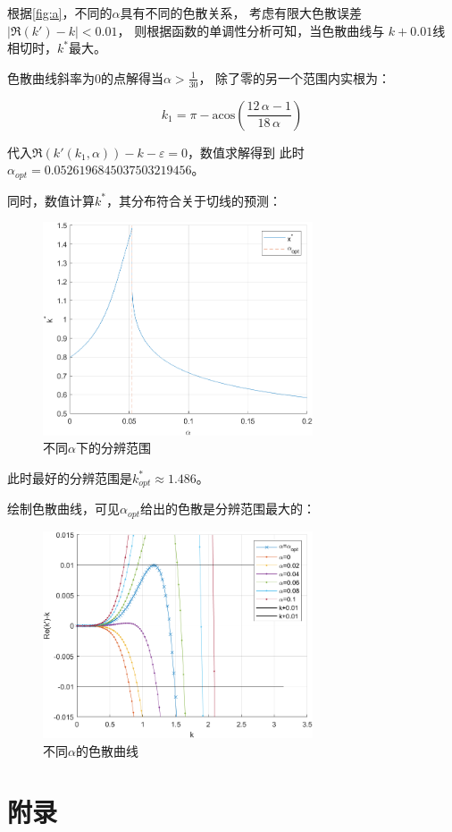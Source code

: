 \documentclass[UTF8,zihao=5]{ctexart} %
\begin{document}
根据\ref{fig:a}，不同的$\alpha$具有不同的色散关系，
考虑有限大色散误差$|\Re(k')-k|<0.01$，
则根据函数的单调性分析可知，当色散曲线与
$k+0.01$线相切时，$k^*$最大。

色散曲线斜率为0的点解得当$\alpha > \frac{1}{30}$，
除了零的另一个范围内实根为：

$$
    k_1=\pi -\mathrm{acos}\left(\frac{12\,\alpha -1}{18\,\alpha }\right)
$$

代入$\Re(k'(k_1,\alpha))-k-\varepsilon=0$，数值求解得到
此时$\alpha_{opt}=0.0526196845037503219456$。

同时，数值计算$k^*$，其分布符合关于切线的预测：
\begin{figure}[H]
    \centering
    \includegraphics[width=8cm]{Aopt.png}  %
    \caption{不同$\alpha$下的分辨范围}
\end{figure}
此时最好的分辨范围是$k^*_{opt}\approx1.486$。

绘制色散曲线，可见$\alpha_{opt}$给出的色散是分辨范围最大的：
\begin{figure}[H]
    \centering
    \includegraphics[width=8cm]{RE_Err.png}  %
    \caption{不同$\alpha$的色散曲线}
\end{figure}


\section{附录}
\end{document}
